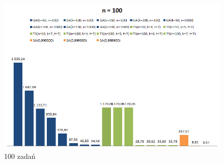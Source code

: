 \documentclass[wide,a4paper,titlepage,12pt] {article}
\begin{document}
\begin{landscape}
\begin{figure}[htbp]
  \begin{center}
         \includegraphics[scale = 1.0]{img/all100.PNG}
         \caption{100 zadań}
  \end{center}
\end{figure}
\end{landscape}
\end{document}
